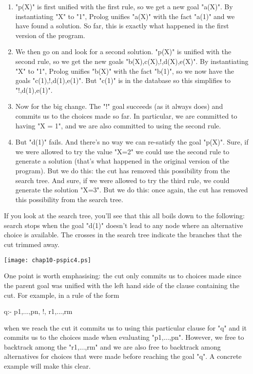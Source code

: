 \begin{enumerate}

\item{}"p(X)" is first unified with the first rule, so we get a new
goal "a(X)".  By instantiating "X" to "1", Prolog unifies "a(X)" with
the fact "a(1)" and we have found a solution.  So far, this is exactly
what happened in the first version of the program.

\item{}We then go on and look for a second solution.  "p(X)" is
unified with the second rule, so we get the new goals
"b(X),c(X),!,d(X),e(X)".  By instantiating "X" to "1", Prolog unifies
"b(X)" with the fact "b(1)", so we now have the goals
"c(1),!,d(1),e(1)".  But "c(1)" is in the database so this simplifies
to "!,d(1),e(1)".

\item{}Now for the big change.  The "!" goal succeeds (as it always
does) and commits us to the choices made so far.  In particular, we
are committed to having "X = 1", and we are also committed to using
the second rule.

\item{}But "d(1)" fails.  And there's no way we can re-satisfy the
goal "p(X)".  Sure, if we were allowed to try the value "X=2" we could
use the second rule to generate a solution (that's what happened in
the original version of the program).  But we  do this:
the cut has removed this possibility from the search tree.  And sure,
if we were allowed to try the third rule, we could generate the
solution "X=3".  But we  do this: once again, the cut
has removed this possibility from the search tree.
\end{enumerate}

If you look at the search tree, you'll see that this all boils down to
the following: search stops when the goal "d(1)" doesn't lead to any
node where an alternative choice is available. The crosses in the
search tree indicate the branches that the cut  trimmed away.

\begin{center}
\texttt{[image: chap10-pspic4.ps]}
\end{center}

One point is worth emphasising: the cut only commits us to choices
made since the parent goal was unified with the left hand side of the
clause containing the cut.  For example, in a rule of the form
\begin{LPNcodedisplay}
q:- p1,...,pn, !, r1,...,rm
\end{LPNcodedisplay}
when we reach the cut it commits us to using this particular
clause for "q" and it commits us to the choices made when
evaluating "p1,...,pn". However, we  free to backtrack
among the "r1,...,rm" and we are also free to backtrack among
alternatives for choices that were made before reaching the goal
"q". A concrete example will make this clear.

